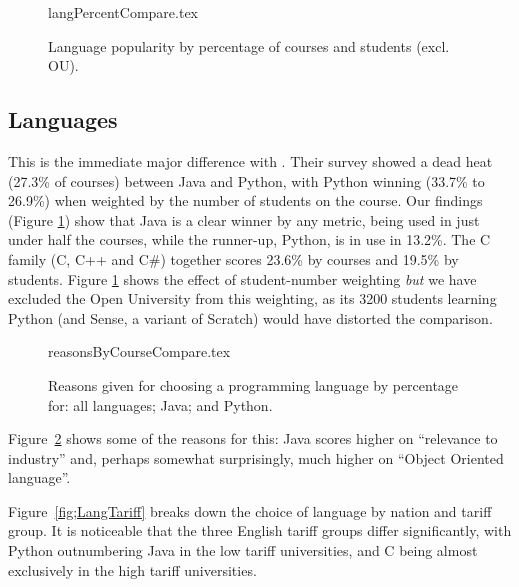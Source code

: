 \documentclass{sig-alternate}
\begin{document}
\begin{figure}
\begin{center}
{langPercentCompare.tex}
\end{center}\vskip-12pt
\caption{Language popularity by percentage of courses and students (excl. OU).\label{fig:lang}}
\end{figure}

\subsection{Languages}

This is the immediate major difference with
\cite{mason+cooper:2014}. Their survey showed a dead heat (27.3\% of
courses) between Java and Python, with Python winning (33.7\% to
26.9\%) when weighted by the number of students on the course.  Our
findings (Figure \ref{fig:lang}) show that Java is a clear winner by
any metric, being used in just under half the courses, while the
runner-up, Python, is in use in 13.2\%. The C family (C, C++ and C\#)
together scores 23.6\% by courses and 19.5\% by students. Figure
\ref{fig:lang} shows the effect of student-number weighting \emph{but}
we have excluded the Open University from this weighting, as its 3200
students learning Python (and Sense, a variant of Scratch) would have
distorted the comparison.


\begin{figure}
\begin{center}
{reasonsByCourseCompare.tex}
\end{center}
\caption{Reasons given for choosing a programming language by percentage for: all languages; Java; and Python.\label{fig:reasons}}
\end{figure}

Figure~\ref{fig:reasons} shows some of the reasons for this: Java
scores higher on ``relevance to industry'' and, perhaps somewhat
surprisingly, much higher on ``Object Oriented language''.

Figure~\ref{fig;LangTariff} breaks down the choice of language by
nation and tariff group.  It is noticeable that the three English
tariff groups differ significantly, with Python outnumbering Java in
the low tariff universities, and C being almost exclusively in the
high tariff universities.
\end{document}
